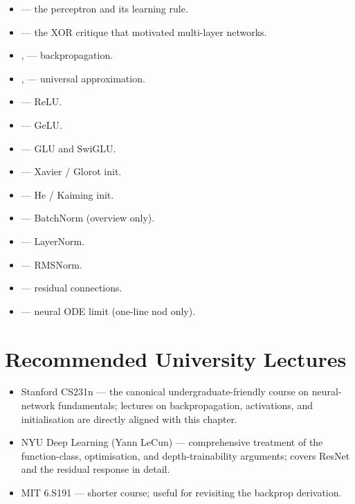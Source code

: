 \begin{itemize}
  \item \citet{rosenblatt1958perceptron} --- the perceptron and
        its learning rule.
  \item \citet{minsky1969perceptrons} --- the XOR critique that
        motivated multi-layer networks.
  \item \citet{werbos1974beyond}, \citet{rumelhart1986learning}
        --- backpropagation.
  \item \citet{cybenko1989approximation},
        \citet{hornik1991approximation} --- universal
        approximation.
  \item \citet{nair2010rectified} --- ReLU.
  \item \citet{hendrycks2016gelu} --- GeLU.
  \item \citet{shazeer2020glu} --- GLU and SwiGLU.
  \item \citet{glorot2010understanding} --- Xavier / Glorot init.
  \item \citet{he2015delving} --- He / Kaiming init.
  \item \citet{ioffe2015batchnorm} --- BatchNorm (overview only).
  \item \citet{ba2016layernorm} --- LayerNorm.
  \item \citet{zhang2019rmsnorm} --- RMSNorm.
  \item \citet{he2016resnet} --- residual connections.
  \item \citet{chen2018neuralode} --- neural ODE limit (one-line
        nod only).
\end{itemize}

\section{Recommended University Lectures}

\begin{itemize}
  \item Stanford CS231n --- the canonical undergraduate-friendly
        course on neural-network fundamentals; lectures on
        backpropagation, activations, and initialisation are
        directly aligned with this chapter.
  \item NYU Deep Learning (Yann LeCun) --- comprehensive
        treatment of the function-class, optimisation, and
        depth-trainability arguments; covers ResNet and the
        residual response in detail.
  \item MIT 6.S191 --- shorter course; useful for revisiting the
        backprop derivation.
\end{itemize}

